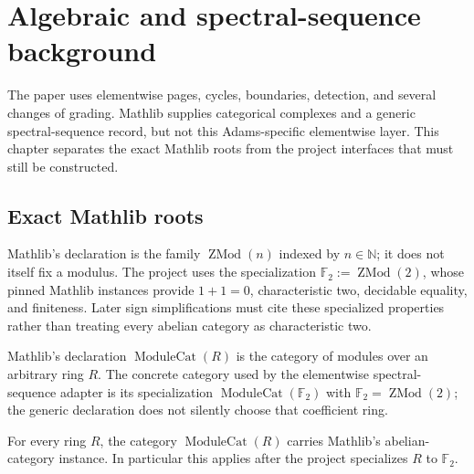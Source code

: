 \chapter{Algebraic and spectral-sequence background}
\label{chap:background}

The paper uses elementwise pages, cycles, boundaries, detection, and several
changes of grading.  Mathlib supplies categorical complexes and a generic
spectral-sequence record, but not this Adams-specific elementwise layer.  This
chapter separates the exact Mathlib roots from the project interfaces that
must still be constructed.

\section{Exact Mathlib roots}

\begin{definition}
  \label{def:mathlib-f2}
  \mathlibok
  Mathlib's declaration is the family $\operatorname{ZMod}(n)$ indexed by
  $n\in\mathbb N$; it does not itself fix a modulus.  The project uses the
  specialization $\mathbb F_2:=\operatorname{ZMod}(2)$, whose pinned Mathlib
  instances provide $1+1=0$, characteristic two, decidable equality, and
  finiteness.  Later sign simplifications must cite these specialized
  properties rather than treating every abelian category as characteristic
  two.
\end{definition}

\begin{definition}
  \label{def:mathlib-f2-module-category}
  \mathlibok
  Mathlib's declaration $\operatorname{ModuleCat}(R)$ is the category of
  modules over an arbitrary ring $R$.  The concrete category used by the
  elementwise spectral-sequence adapter is its specialization
  $\operatorname{ModuleCat}(\mathbb F_2)$ with
  $\mathbb F_2=\operatorname{ZMod}(2)$; the generic declaration does not
  silently choose that coefficient ring.
\end{definition}

\begin{theorem}
  \label{thm:mathlib-module-category-abelian}
  \mathlibok
  For every ring $R$, the category $\operatorname{ModuleCat}(R)$ carries
  Mathlib's abelian-category instance.  In particular this applies after the
  project specializes $R$ to $\mathbb F_2$.
\end{theorem}

